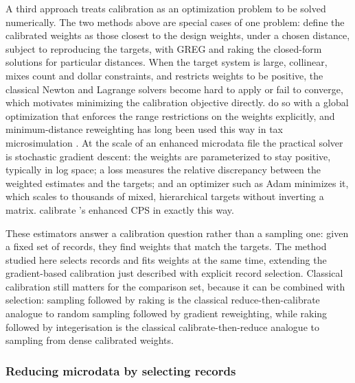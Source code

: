 A third approach treats calibration as an optimization problem to be solved numerically. The two
methods above are special cases of one problem: \citet{deville1992} define the calibrated weights as
those closest to the design weights, under a chosen distance, subject to reproducing the targets,
with GREG and raking the closed-form solutions for particular distances. When the target system is
large, collinear, mixes count and dollar constraints, and restricts weights to be positive, the
classical Newton and Lagrange solvers become hard to apply or fail to converge, which motivates
minimizing the calibration objective directly. \citet{espuny2018} do so with a global optimization
that enforces the range restrictions on the weights explicitly, and minimum-distance reweighting has
long been used this way in tax microsimulation \citep{creedy2003}. At the scale of an enhanced
microdata file the practical solver is stochastic gradient descent: the weights are parameterized to
stay positive, typically in log space; a loss measures the relative discrepancy between the weighted
estimates and the targets; and an optimizer such as Adam \citep{kingma2015} minimizes it, which
scales to thousands of mixed, hierarchical targets without inverting a matrix. \citet{woodruff2024}
calibrate \policyengine{}'s enhanced CPS in exactly this way.

These estimators answer a calibration question rather than a sampling one: given a fixed set of
records, they find weights that match the targets. The method studied here selects records and fits
weights at the same time, extending the gradient-based calibration just described with explicit
record selection. Classical calibration still matters for the comparison set, because it can be
combined with selection: sampling followed by raking is the classical reduce-then-calibrate analogue
to random sampling followed by gradient reweighting, while raking followed by integerisation is the
classical calibrate-then-reduce analogue to sampling from dense calibrated weights.

\subsubsection{Reducing microdata by selecting records}
\label{sp:sec:reduction_methods}

